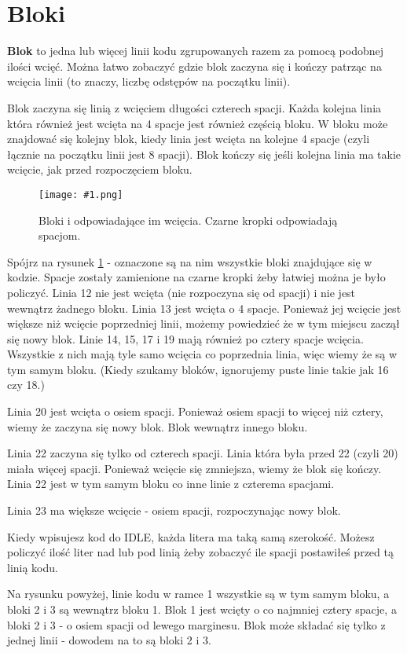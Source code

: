 \documentclass{book}
\newcommand{\img}[3]{
\begin{figure}
\centerline{
	\texttt{[image: \#1.png]}
}
\caption{#2}
\label{#1}
\end{figure}
}
\begin{document}
\section{Bloki}

{\bf Blok} to jedna lub więcej linii kodu zgrupowanych razem za pomocą podobnej ilości wcięć. Można łatwo zobaczyć gdzie blok zaczyna się i kończy patrząc na wcięcia linii (to znaczy, liczbę odstępów na początku linii).

Blok zaczyna się linią z wcięciem długości czterech spacji. Każda kolejna linia która również jest wcięta na 4 spacje jest również częścią bloku. W bloku może znajdować się kolejny blok, kiedy linia jest wcięta na kolejne 4 spacje (czyli łącznie na początku linii jest 8 spacji). Blok kończy się jeśli kolejna linia ma takie wcięcie, jak przed rozpoczęciem bloku.

\img{guess-blocks}{Bloki i odpowiadające im wcięcia. Czarne kropki odpowiadają spacjom.}{7cm}

Spójrz na rysunek \ref{guess-blocks} - oznaczone są na nim wszystkie bloki znajdujące się w kodzie. Spacje zostały zamienione na czarne kropki żeby łatwiej można je było policzyć. Linia 12 nie jest wcięta (nie rozpoczyna się od spacji) i nie jest wewnątrz żadnego bloku. Linia 13 jest wcięta o 4 spacje. Ponieważ jej wcięcie jest większe niż wcięcie poprzedniej linii, możemy powiedzieć że w tym miejscu zaczął się nowy blok. Linie 14, 15, 17 i 19 mają również po cztery spacje wcięcia. Wszystkie z nich mają tyle samo wcięcia co poprzednia linia, więc wiemy że są w tym samym bloku. (Kiedy szukamy bloków, ignorujemy puste linie takie jak 16 czy 18.)

Linia 20 jest wcięta o osiem spacji. Ponieważ osiem spacji to więcej niż cztery, wiemy że zaczyna się nowy blok. Blok wewnątrz innego bloku.

Linia 22 zaczyna się tylko od czterech spacji. Linia która była przed 22 (czyli 20) miała więcej spacji. Ponieważ wcięcie się zmniejsza, wiemy że blok się kończy. Linia 22 jest w tym samym bloku co inne linie z czterema spacjami.

Linia 23 ma większe wcięcie - osiem spacji, rozpoczynając nowy blok.

Kiedy wpisujesz kod do IDLE, każda litera ma taką samą szerokość. Możesz policzyć ilość liter nad lub pod linią żeby zobaczyć ile spacji postawiłeś przed tą linią kodu.

Na rysunku powyżej, linie kodu w ramce 1 wszystkie są w tym samym bloku, a bloki 2 i 3 są wewnątrz bloku 1. Blok 1 jest wcięty o co najmniej cztery spacje, a bloki 2 i 3 - o osiem spacji od lewego marginesu. Blok może składać się tylko z jednej linii - dowodem na to są bloki 2 i 3.
\end{document}
